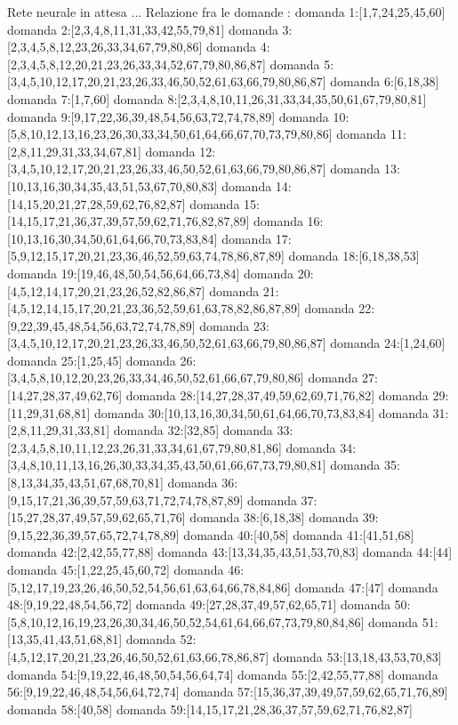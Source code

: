 Rete neurale in attesa ...
Relazione fra le domande :
domanda 1:[1,7,24,25,45,60]
domanda 2:[2,3,4,8,11,31,33,42,55,79,81]
domanda 3:[2,3,4,5,8,12,23,26,33,34,67,79,80,86]
domanda 4:[2,3,4,5,8,12,20,21,23,26,33,34,52,67,79,80,86,87]
domanda 5:[3,4,5,10,12,17,20,21,23,26,33,46,50,52,61,63,66,79,80,86,87]
domanda 6:[6,18,38]
domanda 7:[1,7,60]
domanda 8:[2,3,4,8,10,11,26,31,33,34,35,50,61,67,79,80,81]
domanda 9:[9,17,22,36,39,48,54,56,63,72,74,78,89]
domanda 10:[5,8,10,12,13,16,23,26,30,33,34,50,61,64,66,67,70,73,79,80,86]
domanda 11:[2,8,11,29,31,33,34,67,81]
domanda 12:[3,4,5,10,12,17,20,21,23,26,33,46,50,52,61,63,66,79,80,86,87]
domanda 13:[10,13,16,30,34,35,43,51,53,67,70,80,83]
domanda 14:[14,15,20,21,27,28,59,62,76,82,87]
domanda 15:[14,15,17,21,36,37,39,57,59,62,71,76,82,87,89]
domanda 16:[10,13,16,30,34,50,61,64,66,70,73,83,84]
domanda 17:[5,9,12,15,17,20,21,23,36,46,52,59,63,74,78,86,87,89]
domanda 18:[6,18,38,53]
domanda 19:[19,46,48,50,54,56,64,66,73,84]
domanda 20:[4,5,12,14,17,20,21,23,26,52,82,86,87]
domanda 21:[4,5,12,14,15,17,20,21,23,36,52,59,61,63,78,82,86,87,89]
domanda 22:[9,22,39,45,48,54,56,63,72,74,78,89]
domanda 23:[3,4,5,10,12,17,20,21,23,26,33,46,50,52,61,63,66,79,80,86,87]
domanda 24:[1,24,60]
domanda 25:[1,25,45]
domanda 26:[3,4,5,8,10,12,20,23,26,33,34,46,50,52,61,66,67,79,80,86]
domanda 27:[14,27,28,37,49,62,76]
domanda 28:[14,27,28,37,49,59,62,69,71,76,82]
domanda 29:[11,29,31,68,81]
domanda 30:[10,13,16,30,34,50,61,64,66,70,73,83,84]
domanda 31:[2,8,11,29,31,33,81]
domanda 32:[32,85]
domanda 33:[2,3,4,5,8,10,11,12,23,26,31,33,34,61,67,79,80,81,86]
domanda 34:[3,4,8,10,11,13,16,26,30,33,34,35,43,50,61,66,67,73,79,80,81]
domanda 35:[8,13,34,35,43,51,67,68,70,81]
domanda 36:[9,15,17,21,36,39,57,59,63,71,72,74,78,87,89]
domanda 37:[15,27,28,37,49,57,59,62,65,71,76]
domanda 38:[6,18,38]
domanda 39:[9,15,22,36,39,57,65,72,74,78,89]
domanda 40:[40,58]
domanda 41:[41,51,68]
domanda 42:[2,42,55,77,88]
domanda 43:[13,34,35,43,51,53,70,83]
domanda 44:[44]
domanda 45:[1,22,25,45,60,72]
domanda 46:[5,12,17,19,23,26,46,50,52,54,56,61,63,64,66,78,84,86]
domanda 47:[47]
domanda 48:[9,19,22,48,54,56,72]
domanda 49:[27,28,37,49,57,62,65,71]
domanda 50:[5,8,10,12,16,19,23,26,30,34,46,50,52,54,61,64,66,67,73,79,80,84,86]
domanda 51:[13,35,41,43,51,68,81]
domanda 52:[4,5,12,17,20,21,23,26,46,50,52,61,63,66,78,86,87]
domanda 53:[13,18,43,53,70,83]
domanda 54:[9,19,22,46,48,50,54,56,64,74]
domanda 55:[2,42,55,77,88]
domanda 56:[9,19,22,46,48,54,56,64,72,74]
domanda 57:[15,36,37,39,49,57,59,62,65,71,76,89]
domanda 58:[40,58]
domanda 59:[14,15,17,21,28,36,37,57,59,62,71,76,82,87]
